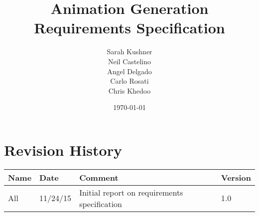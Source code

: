 \documentclass[a4paper]{article}
\begin{document}
\title{Animation Generation Requirements Specification}
\author{Sarah Kushner \\
		Neil Castelino \\
		Angel Delgado \\
		Carlo Rosati \\
		Chris Khedoo}
\date{\today}
\maketitle
\small

\pagebreak
\tableofcontents
\pagebreak
\section{Revision History}
\begin{tabular}{|l|l|l|l|}
\hline
Name	& Date	 		& 	Comment	 								& 	Version	 \\ \hline
All		& 11/24/15		& 	Initial report on requirements specification &  	1.0 	 \\ \hline
\end{tabular}

\pagebreak





\appendix
    
%    
\end{document}
